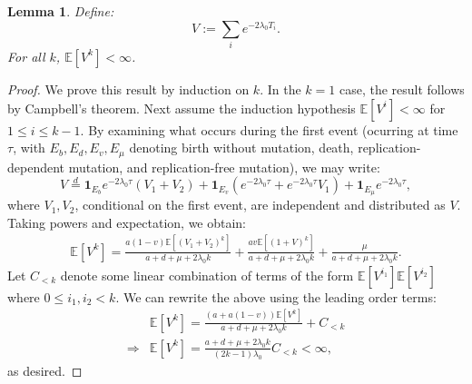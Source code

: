 \documentclass{article}
\numberwithin{equation}{section}
\newtheorem{lemma}{Lemma}
\begin{document}
\begin{lemma}\label{lem:V_moments_finite}
    Define:
    \[V:=\sum_{i}e^{-2\lambda_0 T_i}.\]
    For all $k$, $\mathbb{E}[V^k]<\infty$.
\end{lemma}
\begin{proof}
    We prove this result by induction on $k$. In the $k=1$ case, the result follows by Campbell's theorem. Next assume the induction hypothesis $\mathbb{E}[V^{i}]<\infty$ for $1\leq i\leq k-1$. By examining what occurs during the first event (ocurring at time $\tau$, with $E_b,E_d,E_{v},E_{\mu}$ denoting birth without mutation, death, replication-dependent mutation, and replication-free mutation), we may write:
    \[V\overset{d}{=}\mathbf{1}_{E_b}e^{-2\lambda_0 \tau}(V_1+V_2)+\mathbf{1}_{E_v}(e^{-2\lambda_0 \tau}+e^{-2\lambda_0 \tau}V_1)+\mathbf{1}_{E_\mu}e^{-2\lambda_0 \tau},\]
    where $V_1,V_2$, conditional on the first event, are independent and distributed as $V$. Taking powers and expectation, we obtain:
    \begin{align*}
        \mathbb{E}[V^k]=\frac{a(1-v)\mathbb{E}[(V_1+V_2)^k]}{a+d+\mu+2\lambda_0 k}+\frac{av\mathbb{E}[(1+V)^k]}{a+d+\mu+2\lambda_0 k}+\frac{\mu}{a+d+\mu+2\lambda_0 k}.
    \end{align*}
    Let $C_{<k}$ denote some linear combination of terms of the form $\mathbb{E}[V^{i_1}]\mathbb{E}[V^{i_2}]$ where $0\leq i_1,i_2<k$. We can rewrite the above using the leading order terms:
    \begin{align*}
        &\mathbb{E}[V^k]=\frac{(a+a(1-v))\mathbb{E}[V^k]}{a+d+\mu+2\lambda_0 k}+C_{<k}\\
        \Longrightarrow &\mathbb{E}[V^k]= \frac{a+d+\mu+2\lambda_0 k}{(2k-1)\lambda_0}C_{<k}<\infty,
    \end{align*}
    as desired.
\end{proof}
\end{document}
